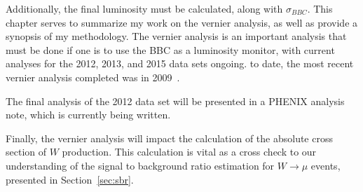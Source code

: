 Additionally, the final luminosity must be calculated, along with
$\sigma_{BBC}$. This chapter serves to summarize my work on the vernier
analysis, as well as provide a synopsis of my methodology. The vernier analysis
is an important analysis that must be done if one is to use the BBC as a
luminosity monitor, with current analyses for the 2012, 2013, and 2015 data sets
ongoing.  to date, the most recent vernier analysis completed was in
2009~\cite{AN888Datta2010}.

The final analysis of the 2012 data set will be presented in a PHENIX analysis
note, which is currently being written.

Finally, the vernier analysis will impact the calculation of the absolute cross
section of $W$ production. This calculation is vital as a cross check to our
understanding of the signal to background ratio estimation for $W\rightarrow\mu$
events, presented in Section~\ref{sec:sbr}.
